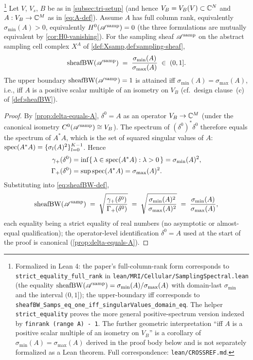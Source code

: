 \begin{theorem}\label{thm:strict-equality}\footnote{Formalized in Lean 4: the paper's full-column-rank form corresponds to \texttt{strict\_equality\_full\_rank} in \texttt{lean/MRI/Cellular/SamplingSpectral.lean} (the equality $\operatorname{sheafBW}(\mathscr{A}^{\mathrm{samp}}) = \sigma_{\min}(A)/\sigma_{\max}(A)$ with domain-last $\sigma_{\min}$ and the interval $(0,1]$); the upper-boundary iff corresponds to \texttt{sheafBW\_Samps\_eq\_one\_iff\_singularValues\_domain\_eq}. The helper \texttt{strict\_equality} proves the more general positive-spectrum version indexed by \texttt{finrank (range A) - 1}. The further geometric interpretation ``iff $A$ is a positive scalar multiple of an isometry on $V_B$'' is a corollary of $\sigma_{\min}(A) = \sigma_{\max}(A)$ derived in the proof body below and is not separately formalized as a Lean theorem. Full correspondence: \texttt{lean/CROSSREF.md}.}
Let $V$, $V_s$, $B$ be as in \cref{subsec:tri-setup} (and hence
$V_B = V_B(V) \subset \mathbb{C}^N$ and $A : V_B \to \mathbb{C}^M$ as in
\cref{eq:A-def}). Assume $A$ has full column rank, equivalently
$\sigma_{\min}(A) > 0$, equivalently $H^0(\mathscr{A}^{\mathrm{samp}}) = 0$ (the three
formulations are mutually equivalent by \cref{cor:H0-vanishing}).
For the sampling sheaf $\mathscr{A}^{\mathrm{samp}}$ on the abstract sampling cell
complex $X^A$ of \cref{def:Xsamp,def:sampling-sheaf},
\begin{equation}\label{eq:strict-equality}
  \operatorname{sheafBW}(\mathscr{A}^{\mathrm{samp}}) \;=\; \frac{\sigma_{\min}(A)}{\sigma_{\max}(A)}
  \;\in\; (0, 1].
\end{equation}
The upper boundary $\operatorname{sheafBW}(\mathscr{A}^{\mathrm{samp}}) = 1$ is attained iff
$\sigma_{\min}(A) = \sigma_{\max}(A)$, i.e., iff $A$ is a positive
scalar multiple of an isometry on $V_B$ (cf.\ design clause~(c) of
\cref{def:sheafBW}).
\end{theorem}

\begin{proof}
By \cref{prop:delta-equals-A},
$\delta^0 = A$ as an operator $V_B \to \mathbb{C}^M$ (under the canonical
isometry $C^0(\mathscr{A}^{\mathrm{samp}}) \cong V_B$). The spectrum of
$(\delta^0)^* \delta^0$ therefore equals the spectrum of $A^* A$,
which is the set of squared singular values of $A$:
$\operatorname{spec}(A^* A) = \{\sigma_l(A)^2\}_{l=0}^{K-1}$. Hence
\begin{align*}
  \gamma_+(\delta^0)
  &= \inf\{\,\lambda \in \operatorname{spec}(A^* A) : \lambda > 0\,\}
   = \sigma_{\min}(A)^2, \\
  \Gamma_+(\delta^0)
  &= \sup \operatorname{spec}(A^* A)
   = \sigma_{\max}(A)^2.
\end{align*}
Substituting into \cref{eq:sheafBW-def},
\[
  \operatorname{sheafBW}(\mathscr{A}^{\mathrm{samp}})
  \;=\; \sqrt{\frac{\gamma_+(\delta^0)}{\Gamma_+(\delta^0)}}
  \;=\; \sqrt{\frac{\sigma_{\min}(A)^2}{\sigma_{\max}(A)^2}}
  \;=\; \frac{\sigma_{\min}(A)}{\sigma_{\max}(A)},
\]
each equality being a strict equality of real numbers (no asymptotic
or almost-equal qualification); the operator-level identification
$\delta^0 = A$ used at the start of the proof is canonical
(\cref{prop:delta-equals-A}).
\end{proof}

